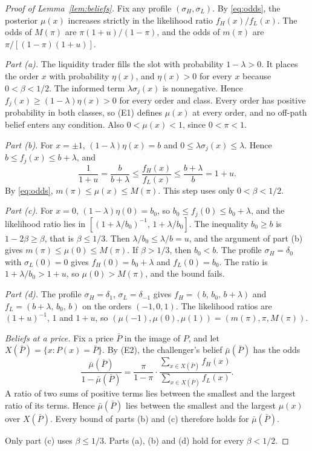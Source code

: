 \begin{proof}[Proof of Lemma~\ref{lem:beliefs}]
Fix any profile \((\sigma_H,\sigma_L)\). By \eqref{eq:odds}, the posterior \(\mu(x)\) increases strictly in the
likelihood ratio \(f_H(x)/f_L(x)\). The odds of \(M(\pi)\) are \(\pi(1+u)/(1-\pi)\), and the odds of \(m(\pi)\) are
\(\pi/[(1-\pi)(1+u)]\).

\emph{Part (a).} The liquidity trader fills the slot with probability \(1-\lambda>0\). It places the order \(x\)
with probability \(\eta(x)\), and \(\eta(x)>0\) for every \(x\) because \(0<\beta<1/2\). The informed term
\(\lambda\sigma_j(x)\) is nonnegative. Hence \(f_j(x)\ge(1-\lambda)\eta(x)>0\) for every order and class. Every
order has positive probability in both classes, so (E1) defines \(\mu(x)\) at every order, and no off-path belief
enters any condition. Also \(0<\mu(x)<1\), since \(0<\pi<1\).

\emph{Part (b).} For \(x=\pm1\), \((1-\lambda)\eta(x)=b\) and \(0\le\lambda\sigma_j(x)\le\lambda\). Hence
\(b\le f_j(x)\le b+\lambda\), and
\[
\frac1{1+u}=\frac{b}{b+\lambda}\le\frac{f_H(x)}{f_L(x)}\le\frac{b+\lambda}{b}=1+u .
\]
By \eqref{eq:odds}, \(m(\pi)\le\mu(x)\le M(\pi)\). This step uses only \(0<\beta<1/2\).

\emph{Part (c).} For \(x=0\), \((1-\lambda)\eta(0)=b_0\), so \(b_0\le f_j(0)\le b_0+\lambda\), and the likelihood
ratio lies in \([(1+\lambda/b_0)^{-1},\,1+\lambda/b_0]\). The inequality \(b_0\ge b\) is \(1-2\beta\ge\beta\), that
is \(\beta\le1/3\). Then \(\lambda/b_0\le\lambda/b=u\), and the argument of part (b) gives
\(m(\pi)\le\mu(0)\le M(\pi)\). If \(\beta>1/3\), then \(b_0<b\). The profile \(\sigma_H=\delta_0\) with
\(\sigma_L(0)=0\) gives \(f_H(0)=b_0+\lambda\) and \(f_L(0)=b_0\). The ratio is \(1+\lambda/b_0>1+u\), so
\(\mu(0)>M(\pi)\), and the bound fails.

\emph{Part (d).} The profile \(\sigma_H=\delta_1\), \(\sigma_L=\delta_{-1}\) gives \(f_H=(b,\,b_0,\,b+\lambda)\) and
\(f_L=(b+\lambda,\,b_0,\,b)\) on the orders \((-1,0,1)\). The likelihood ratios are \((1+u)^{-1}\), \(1\) and
\(1+u\), so \((\mu(-1),\mu(0),\mu(1))=(m(\pi),\pi,M(\pi))\).

\emph{Beliefs at a price.} Fix a price \(\bar P\) in the image of \(P\), and let \(X(\bar P)=\{x:P(x)=\bar P\}\).
By (E2), the challenger's belief \(\bar\mu(\bar P)\) has the odds
\[
\frac{\bar\mu(\bar P)}{1-\bar\mu(\bar P)}=\frac{\pi}{1-\pi}\cdot
\frac{\sum_{x\in X(\bar P)}f_H(x)}{\sum_{x\in X(\bar P)}f_L(x)} .
\]
A ratio of two sums of positive terms lies between the smallest and the largest ratio of its terms. Hence
\(\bar\mu(\bar P)\) lies between the smallest and the largest \(\mu(x)\) over \(X(\bar P)\). Every bound of parts (b)
and (c) therefore holds for \(\bar\mu(\bar P)\).

Only part (c) uses \(\beta\le1/3\). Parts (a), (b) and (d) hold for every \(\beta<1/2\).
\end{proof}

